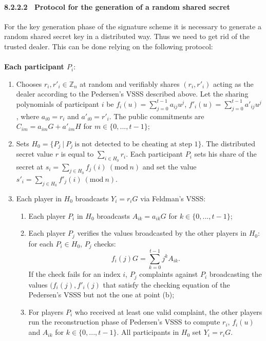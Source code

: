 \bigskip

\paragraph{8.2.2.2 \ Protocol for the generation of a random shared secret}
For the key generation phase of the signature scheme it is necessary to generate a random shared secret key in a distributed way. Thus we need to get rid of the trusted dealer. This can be done relying on the following protocol:
\\
\\
{\bf Each participant $P_i$}:
\begin{enumerate}
	\item Chooses $r_i, r'_i \in \mathbb{Z}_n$ at random and verifiably shares $(r_i, r'_i)$ acting as the dealer according to the Pedersen's VSSS described above. Let the sharing polynomials of participant $i$ be $f_i(u) = \sum_{j = 0}^{t - 1}a_{ij}u^j$, $f'_i(u) = \sum_{j= 0}^{t - 1}a'_{ij}u^j$, where $a_{i0} = r_i$ and $a'_{i0} = r'_i$. The public commitments are $C_{im} = a_{im}G + a'_{im}H$ for $m \in \{0, ..., t - 1\}$;
	\item Sets $H_0 = \{P_j \ | \ P_j \ \text{is not detected to be cheating at step 1}\}$. The distributed secret value $r$ is equal to $\sum_{i \in H_0}r_i$. Each participant $P_i$ sets his share of the secret at $s_i= \sum_{j \in H_0}f_j(i) \ (\text{mod} \ n)$ and set the value $s'_i = \sum_{j \in H_0}f'_j(i) \ (\text{mod} \ n)$.
	\item Each player in $H_0$ broadcasts $Y_i = r_iG$ via Feldman's VSSS:
	\begin{enumerate}
		\item Each player $P_i$ in $H_0$ broadcasts $A_{ik} = a_{ik}G$ for $k \in \{0, ..., t - 1\}$;
		\item Each player $P_j$ verifies the values broadcasted by the other players in $H_0$: for each $P_i \in H_0$, $P_j$ checks:
		$$f_i(j)G = \sum_{k = 0}^{t - 1} j^kA_{ik}.$$
		If the check fails for an index $i$, $P_j$ complaints against $P_i$ broadcasting the values $(f_i(j), f'_i(j)$ that satisfy the checking equation of the Pedersen's VSSS but not the one at point (b);
		\item For players $P_i$ who received at least one valid complaint, the other players run the reconstruction phase of Pedersen's VSSS to compute $r_i$, $f_i(u)$ and $A_{ik}$ for $k \in \{0, ..., t - 1\}$. All participants in $H_0$ set $Y_i = r_iG$. 
	\end{enumerate} 
\end{enumerate}
